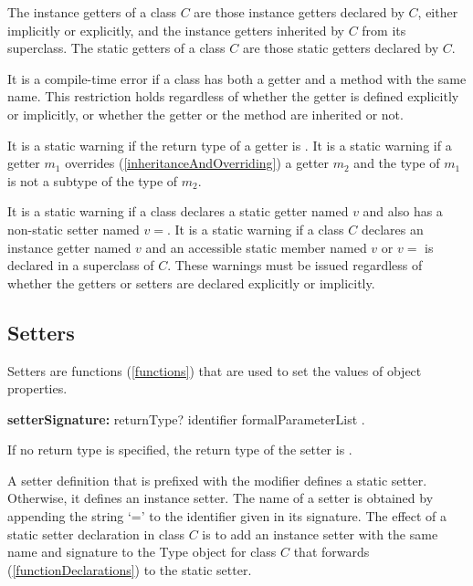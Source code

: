 \documentclass{article}
\newcommand{\code}[1]{{\sf #1}}
\begin{document}

\LMHash{}
The instance getters of a class $C$ are those instance getters declared by $C$, either implicitly or explicitly, and the instance getters inherited by $C$ from its superclass. The static getters of a class $C$ are those static getters declared by $C$.

\LMHash{}
It is a compile-time error if a class has both a getter and a method with the same name. This restriction holds regardless of whether the getter is defined explicitly or implicitly, or whether the getter or the method are inherited or not.


\LMHash{}
It is a static warning if the return type of a getter is \VOID.
It is a static warning if a getter $m_1$ overrides  (\ref{inheritanceAndOverriding}) a getter
$m_2$ and the type of $m_1$ is not a subtype of the type of $m_2$.

\LMHash{}
It is a static warning if a class  declares a static getter named $v$ and also has a non-static setter named $v=$. It is a static warning if a class $C$ declares an instance getter named $v$ and an accessible static member named $v$ or $v=$ is declared in a superclass of $C$. These warnings must be issued regardless of whether the getters or setters are declared explicitly or implicitly.

\subsection{Setters}

\LMHash{}
Setters are functions (\ref{functions}) that are used to set the values of object properties.


\begin{grammar}
{\bf setterSignature:}
       returnType? \SET{} identifier formalParameterList
.
\end{grammar}

\LMHash{}
If no return type is specified, the return type of the setter is  \DYNAMIC{}.

\LMHash{}
A setter definition that is prefixed with the \STATIC{} modifier defines a static setter. Otherwise, it defines an instance setter. The name of a setter is  obtained by appending the  string `='  to the identifier given in its signature. The effect of a static setter declaration in class $C$ is to add an instance setter with the same name and signature to the \code{Type} object for class $C$ that forwards (\ref{functionDeclarations})  to the static setter.
\end{document}
